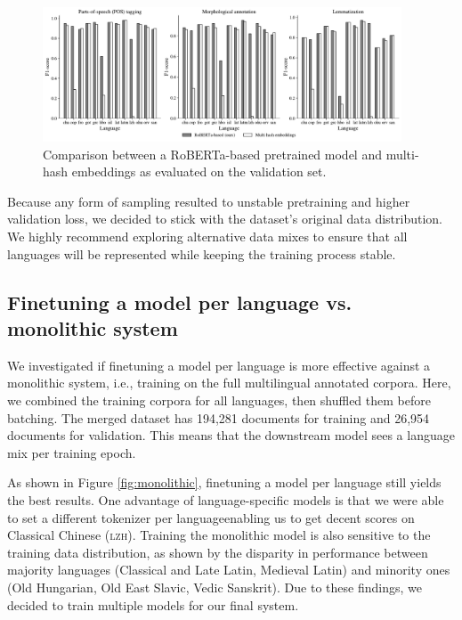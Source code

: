 \documentclass[11pt]{article}
\begin{document}
\begin{figure}[t]
  \centering
  \includegraphics[width=0.95\textwidth]{figures/hashembed.pdf}
  \caption{Comparison between a RoBERTa-based pretrained model and multi-hash embeddings \cite{miranda-etal-2022-multi} as evaluated on the validation set.}
  \label{fig:hashembed}
\end{figure}


Because any form of sampling resulted to unstable pretraining and higher validation loss, we decided to stick with the dataset's original data distribution.
We highly recommend exploring alternative data mixes to ensure that all languages will be represented while keeping the training process stable.

\subsection{Finetuning a model per language vs. monolithic system}

We investigated if finetuning a model per language is more effective against a monolithic system, i.e., training on the full multilingual annotated corpora.
Here, we combined the training corpora for all languages, then shuffled them before batching.
The merged dataset has 194,281 documents for training and 26,954 documents for validation.
This means that the downstream model sees a language mix per training epoch.

As shown in Figure \ref{fig:monolithic}, finetuning a model per language still yields the best results.
One advantage of language-specific models is that we were able to set a different tokenizer per language\textemdash enabling us to get decent scores on Classical Chinese (\textsc{lzh}).
Training the monolithic model is also sensitive to the training data distribution, as shown by the disparity in performance between majority languages (Classical and Late Latin, Medieval Latin) and minority ones (Old Hungarian, Old East Slavic, Vedic Sanskrit).
Due to these findings, we decided to train multiple models for our final system.
\end{document}
